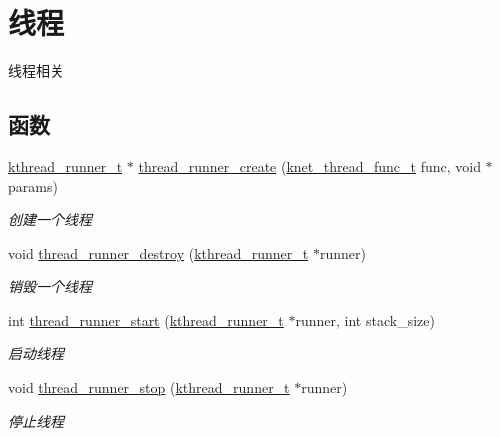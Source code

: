 \hypertarget{a00121}{}\section{线程}
\label{a00121}


线程相关  


\subsection*{函数}
\begin{DoxyCompactItemize}
\item 
\hyperlink{a00056_a4f78c259c9527c821f1a6f87495dd339_a4f78c259c9527c821f1a6f87495dd339}{kthread\+\_\+runner\+\_\+t} $\ast$ \hyperlink{a00121_gacc8838f250e5f685580a508e93d3f636_gacc8838f250e5f685580a508e93d3f636}{thread\+\_\+runner\+\_\+create} (\hyperlink{a00056_a8741dac4a9f8d97603eb3a30a3473b13_a8741dac4a9f8d97603eb3a30a3473b13}{knet\+\_\+thread\+\_\+func\+\_\+t} func, void $\ast$params)
\begin{DoxyCompactList}\small\item\em 创建一个线程 \end{DoxyCompactList}\item 
void \hyperlink{a00121_gaa9112d70f3e5a8dcf648ce531332f66a_gaa9112d70f3e5a8dcf648ce531332f66a}{thread\+\_\+runner\+\_\+destroy} (\hyperlink{a00056_a4f78c259c9527c821f1a6f87495dd339_a4f78c259c9527c821f1a6f87495dd339}{kthread\+\_\+runner\+\_\+t} $\ast$runner)
\begin{DoxyCompactList}\small\item\em 销毁一个线程 \end{DoxyCompactList}\item 
int \hyperlink{a00121_gae125061eb96b154766c0a414eb74065c_gae125061eb96b154766c0a414eb74065c}{thread\+\_\+runner\+\_\+start} (\hyperlink{a00056_a4f78c259c9527c821f1a6f87495dd339_a4f78c259c9527c821f1a6f87495dd339}{kthread\+\_\+runner\+\_\+t} $\ast$runner, int stack\+\_\+size)
\begin{DoxyCompactList}\small\item\em 启动线程 \end{DoxyCompactList}\item 
void \hyperlink{a00121_gac8644b2d2ca5580e0cac7378154ae2e0_gac8644b2d2ca5580e0cac7378154ae2e0}{thread\+\_\+runner\+\_\+stop} (\hyperlink{a00056_a4f78c259c9527c821f1a6f87495dd339_a4f78c259c9527c821f1a6f87495dd339}{kthread\+\_\+runner\+\_\+t} $\ast$runner)
\begin{DoxyCompactList}\small\item\em 停止线程 \end{DoxyCompactList}\item 

\end{DoxyCompactItemize}
